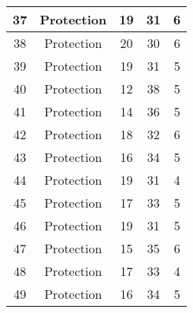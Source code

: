 \documentclass[results.tex]{subfiles}
\begin{document}
\begin{center}
\begin{tabular}{| c || c | c | c | c |}
            \hline
            37                      & Protection                   & 19                     & 31                      & 6                    \\
            \hline
            38                      & Protection                   & 20                     & 30                      & 6                    \\
            \hline
            39                      & Protection                   & 19                     & 31                      & 5                    \\
            \hline
            40                      & Protection                   & 12                     & 38                      & 5                    \\
            \hline
            41                      & Protection                   & 14                     & 36                      & 5                    \\
            \hline
            42                      & Protection                   & 18                     & 32                      & 6                    \\
            \hline
            43                      & Protection                   & 16                     & 34                      & 5                    \\
            \hline
            44                      & Protection                   & 19                     & 31                      & 4                    \\
            \hline
            45                      & Protection                   & 17                     & 33                      & 5                    \\
            \hline
            46                      & Protection                   & 19                     & 31                      & 5                    \\
            \hline
            47                      & Protection                   & 15                     & 35                      & 6                    \\
            \hline
            48                      & Protection                   & 17                     & 33                      & 4                    \\
            \hline
            49                      & Protection                   & 16                     & 34                      & 5                    \\
            \hline
        \end{tabular}
    \end{center}
\end{document}
